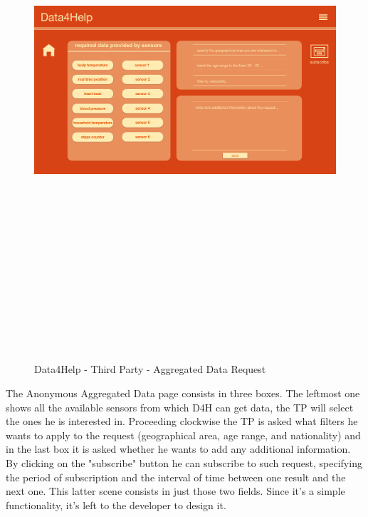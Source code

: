 \begin{figure}[H]
	\includegraphics[width=.6\linewidth, height = 20cm, keepaspectratio]{./Images/Mockups/Data4Help/D4HTP/D4HTP_AggregatedDataRequest.png}
	\centering
	\caption{Data4Help - Third Party - Aggregated Data Request}
	\label{fig:sab}
\end{figure}

The Anonymous Aggregated Data page consists in three boxes.
The leftmost one shows all the available sensors from which D4H can get data, the TP will select the ones he is interested in.
Proceeding clockwise the TP is asked what filters he wants to apply to the request (geographical area, age range, and nationality) and in the last box it is asked whether he wants to add any additional information.
By clicking on the "subscribe" button he can subscribe to such request, specifying the period of subscription and the interval of time between one result and the next one.
This latter scene consists in just those two fields. Since it's a simple functionality, it's left to the developer to design it.

